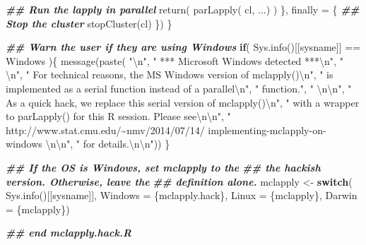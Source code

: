 \documentclass[
  11pt,
  french,
  a4paper,
  extrafontsizes,onecolumn,openright
  ]{memoir}
\newenvironment{Shaded}{\begin{snugshade}}{\end{snugshade}}
\newcommand{\AttributeTok}[1]{\textcolor[rgb]{0.77,0.63,0.00}{#1}}
\newcommand{\ControlFlowTok}[1]{\textcolor[rgb]{0.13,0.29,0.53}{\textbf{#1}}}
\newcommand{\DocumentationTok}[1]{\textcolor[rgb]{0.56,0.35,0.01}{\textbf{\textit{#1}}}}
\newcommand{\FunctionTok}[1]{\textcolor[rgb]{0.00,0.00,0.00}{#1}}
\newcommand{\NormalTok}[1]{#1}
\newcommand{\OtherTok}[1]{\textcolor[rgb]{0.56,0.35,0.01}{#1}}
\newcommand{\SpecialCharTok}[1]{\textcolor[rgb]{0.00,0.00,0.00}{#1}}
\newcommand{\StringTok}[1]{\textcolor[rgb]{0.31,0.60,0.02}{#1}}
\begin{document}
\begin{Shaded}
\begin{Highlighting}[]
    \DocumentationTok{\#\# Run the lapply in parallel }
    \FunctionTok{return}\NormalTok{( }\FunctionTok{parLapply}\NormalTok{( cl, ...) )}
\NormalTok{  \}, }\AttributeTok{finally =}\NormalTok{ \{        }
    \DocumentationTok{\#\# Stop the cluster}
    \FunctionTok{stopCluster}\NormalTok{(cl)}
\NormalTok{  \})}
\NormalTok{\}}

\DocumentationTok{\#\# Warn the user if they are using Windows}
\ControlFlowTok{if}\NormalTok{( }\FunctionTok{Sys.info}\NormalTok{()[[}\StringTok{\textquotesingle{}sysname\textquotesingle{}}\NormalTok{]] }\SpecialCharTok{==} \StringTok{\textquotesingle{}Windows\textquotesingle{}}\NormalTok{ )\{}
  \FunctionTok{message}\NormalTok{(}\FunctionTok{paste}\NormalTok{(}
    \StringTok{"}\SpecialCharTok{\textbackslash{}n}\StringTok{"}\NormalTok{, }
    \StringTok{"   *** Microsoft Windows detected ***}\SpecialCharTok{\textbackslash{}n}\StringTok{"}\NormalTok{,}
    \StringTok{"   }\SpecialCharTok{\textbackslash{}n}\StringTok{"}\NormalTok{,}
    \StringTok{"   For technical reasons, the MS Windows version of mclapply()}\SpecialCharTok{\textbackslash{}n}\StringTok{"}\NormalTok{,}
    \StringTok{"   is implemented as a serial function instead of a parallel}\SpecialCharTok{\textbackslash{}n}\StringTok{"}\NormalTok{,}
    \StringTok{"   function."}\NormalTok{,}
    \StringTok{"   }\SpecialCharTok{\textbackslash{}n\textbackslash{}n}\StringTok{"}\NormalTok{,}
    \StringTok{"   As a quick hack, we replace this serial version of mclapply()}\SpecialCharTok{\textbackslash{}n}\StringTok{"}\NormalTok{,}
    \StringTok{"   with a wrapper to parLapply() for this R session. Please see}\SpecialCharTok{\textbackslash{}n\textbackslash{}n}\StringTok{"}\NormalTok{,}
    \StringTok{"     http://www.stat.cmu.edu/\textasciitilde{}nmv/2014/07/14/}
\StringTok{    implementing{-}mclapply{-}on{-}windows }\SpecialCharTok{\textbackslash{}n\textbackslash{}n}\StringTok{"}\NormalTok{,}
    \StringTok{"   for details.}\SpecialCharTok{\textbackslash{}n\textbackslash{}n}\StringTok{"}\NormalTok{))}
\NormalTok{\}}

\DocumentationTok{\#\# If the OS is Windows, set mclapply to the}
\DocumentationTok{\#\# the hackish version. Otherwise, leave the}
\DocumentationTok{\#\# definition alone. }
\NormalTok{mclapply }\OtherTok{\textless{}{-}} \ControlFlowTok{switch}\NormalTok{( }\FunctionTok{Sys.info}\NormalTok{()[[}\StringTok{\textquotesingle{}sysname\textquotesingle{}}\NormalTok{]],}
                    \AttributeTok{Windows =}\NormalTok{ \{mclapply.hack\}, }
                    \AttributeTok{Linux   =}\NormalTok{ \{mclapply\},}
                    \AttributeTok{Darwin  =}\NormalTok{ \{mclapply\})}

\DocumentationTok{\#\# end mclapply.hack.R}
\end{Highlighting}
\end{Shaded}
\end{document}
